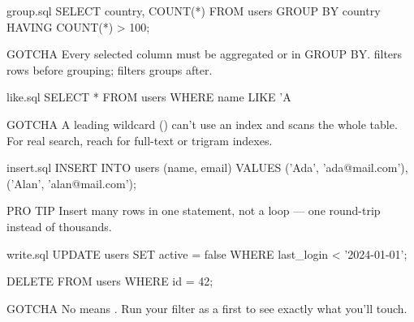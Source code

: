 \begin{sld}
  \begin{codecard}{group.sql}
SELECT country, COUNT(*)
FROM users
GROUP BY country
HAVING COUNT(*) > 100;
  \end{codecard}
  \begin{callout}[dotamber]{GOTCHA}
  Every selected column must be aggregated or in GROUP BY.  filters rows before grouping;  filters groups after.
  \end{callout}
\end{sld}

\begin{sld}
  \begin{codecard}{like.sql}
SELECT * FROM users
WHERE name LIKE 'A%
  \end{codecard}
  \begin{callout}[dotamber]{GOTCHA}
  A leading wildcard () can't use an index and scans the whole table. For real search, reach for full-text or trigram indexes.
  \end{callout}
\end{sld}

\begin{sld}
  \begin{codecard}{insert.sql}
INSERT INTO users (name, email) VALUES
  ('Ada',  'ada@mail.com'),
  ('Alan', 'alan@mail.com');
  \end{codecard}
  \begin{callout}[dotgreen]{PRO TIP}
  Insert many rows in one statement, not a loop — one round-trip instead of thousands.
  \end{callout}
\end{sld}

\begin{sld}
  \begin{codecard}{write.sql}
UPDATE users SET active = false
WHERE last_login < '2024-01-01';

DELETE FROM users WHERE id = 42;
  \end{codecard}
  \begin{callout}[dotamber]{GOTCHA}
  No  means . Run your filter as a  first to see exactly what you'll touch.
  \end{callout}
\end{sld}

